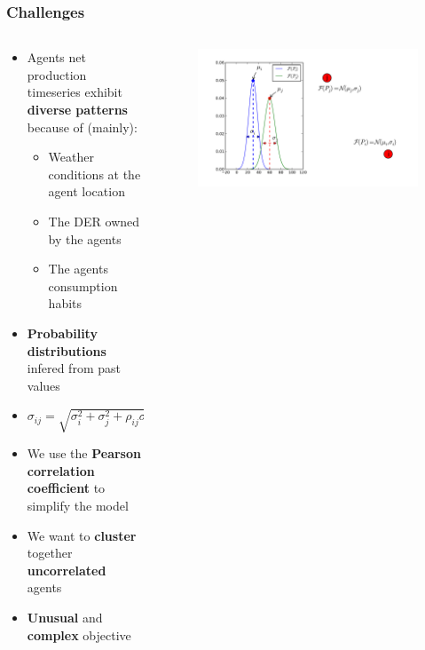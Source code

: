 \documentclass[xcolor=dvipsnames]{beamer}
\begin{document}
%
%
\begin{frame}
	\frametitle{Challenges}
	
	\begin{columns}
		\begin{column}{.5 \linewidth}
			\begin{scriptsize}
			\begin{itemize}			
				\item Agents net production timeseries exhibit \textbf{diverse patterns} because of (mainly):
					\begin{itemize}
						\item {\tiny Weather conditions at the agent location}
						\item {\tiny The DER owned by the agents}
						\item {\tiny The agents consumption habits }
					\end{itemize}
				\item \textbf{Probability distributions} infered from past values
				\item $ \sigma_{ij} = \sqrt{ \sigma_{i}^{2} + \sigma_{j}^{2} + \rho_{ij} \sigma_{i} \sigma_{j} } $
				\item We use the \textbf{Pearson correlation coefficient} to simplify the model
				\item We want to \textbf{cluster} together \textbf{uncorrelated} agents
				\item \textbf{Unusual} and \textbf{complex} objective
			\end{itemize}
			\end{scriptsize}
		\end{column}
		\begin{column}{.5 \linewidth}
			\begin{figure}
				\includegraphics[scale=.25]{example_1.pdf}

\end{figure}
\end{column}
\end{columns}
\end{frame}
\end{document}
